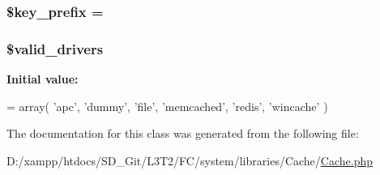 \subsubsection[{\$key\+\_\+prefix}]{\setlength{\rightskip}{0pt plus 5cm}\$key\+\_\+prefix = \textquotesingle{}\textquotesingle{}}\label{class_c_i___cache_ac5ae5bfe56bac385a2687d7503487f38}
\hypertarget{class_c_i___cache_a32d963b3d49fd67f188c1a74d38be6df}{}
\subsubsection[{\$valid\+\_\+drivers}]{\setlength{\rightskip}{0pt plus 5cm}\$valid\+\_\+drivers\hspace{0.3cm}{\ttfamily [protected]}}\label{class_c_i___cache_a32d963b3d49fd67f188c1a74d38be6df}
{\bfseries Initial value\+:}
\begin{DoxyCode}
= array(
        \textcolor{stringliteral}{'apc'},
        \textcolor{stringliteral}{'dummy'},
        \textcolor{stringliteral}{'file'},
        \textcolor{stringliteral}{'memcached'},
        \textcolor{stringliteral}{'redis'},
        \textcolor{stringliteral}{'wincache'}
    )
\end{DoxyCode}


The documentation for this class was generated from the following file\+:\begin{DoxyCompactItemize}
\item 
D\+:/xampp/htdocs/\+S\+D\+\_\+\+Git/\+L3\+T2/\+F\+C/system/libraries/\+Cache/\hyperlink{_cache_8php}{Cache.\+php}\end{DoxyCompactItemize}
